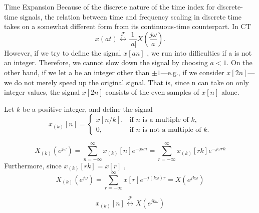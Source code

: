 \begin{frame}{Time Expansion}
    Because of the discrete nature of the time index for discrete-time signals, the relation between time and frequency scaling in discrete time takes on a somewhat different form from its continuous-time counterpart. In CT
    \begin{equation*}
        x(at)  \overset{\mathcal{F}}{\leftrightarrow}  \frac{1}{|a|} X\left(\frac{j\omega}{a}\right).
    \end{equation*}
    However, if we try to define the signal $x[an]$ , we run into difficulties if a is not an integer. Therefore, we cannot slow down the signal by choosing $a < 1$. On the other hand, if we let a be an integer other than $\pm1$---e.g., if we consider $x[2n]$---we do not merely
    speed up the original signal. That is, since n can take on only integer values, the signal $x[2n]$ consists of the even samples of $x[n]$ alone.

    Let $k$ be a positive integer, and define the signal
    \begin{equation*}
        x_{(k)}[n] = \begin{cases}x[n/k], & \text{if $n$ is a multiple of $k$},\\0, & \text{if $n$ is not a multiple of $k$}. \end{cases}
    \end{equation*}
\end{frame}

\begin{frame}
        \begin{figure}
            \centering
            
        \end{figure}
\end{frame}

\begin{frame}
    \begin{equation*}
        X_{(k)}(e^{j\omega}) = \sum_{n=-\infty}^{\infty}x_{(k)}[n]e^{-j\omega n} = \sum_{r=-\infty}^{\infty}x_{(k)}[rk]e^{-j\omega rk}
    \end{equation*}
    Furthermore, since $x_{(k)}[rk] = x[r]$ ,
    \begin{equation*}
        X_{(k)}(e^{j\omega}) = \sum_{r=-\infty}^{\infty}x[r]e^{-j(k\omega) r} = X(e^{jk\omega})
    \end{equation*}

    \begin{equation*}
        x_{(k)}[n]  \overset{\mathcal{F}}{\leftrightarrow}  X(e^{jk\omega})
    \end{equation*}
\end{frame}


